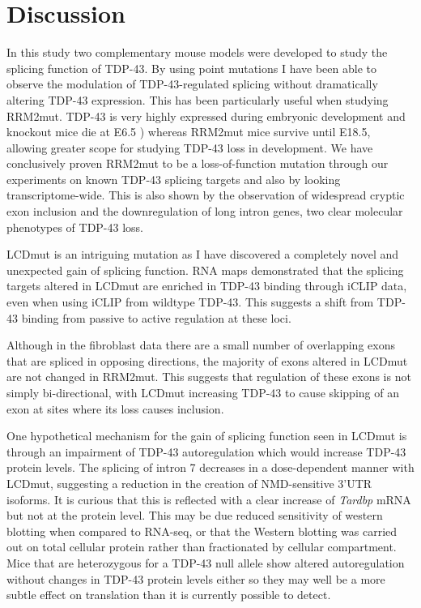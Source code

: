 \clearpage

\section{Discussion}

In this study  two complementary mouse models were developed to study the splicing function of TDP-43. 
By using point mutations I have been able to observe the modulation of TDP-43-regulated splicing without dramatically altering TDP-43 expression. 
This has been particularly useful when studying RRM2mut. 
TDP-43 is very highly expressed during embryonic development and knockout mice die at E6.5 \citep{Ricketts2014}) whereas RRM2mut mice survive until E18.5, allowing greater scope for studying TDP-43 loss in development.
We have conclusively proven RRM2mut to be a loss-of-function mutation through our experiments on known TDP-43 splicing targets and also by looking transcriptome-wide. 
This is also shown by the observation of widespread cryptic exon inclusion and the downregulation of long intron genes, two clear molecular phenotypes of TDP-43 loss.

LCDmut is an intriguing mutation as I have discovered a completely novel and unexpected gain of splicing function. 
RNA maps demonstrated that the splicing targets altered in LCDmut are enriched in TDP-43 binding through iCLIP data, even when using iCLIP from wildtype TDP-43. 
This suggests a shift from TDP-43 binding from passive to active regulation at these loci.

Although in the fibroblast data there are a small number of overlapping exons that are spliced in opposing directions, the majority of exons altered in LCDmut are not changed in RRM2mut. 
This suggests that regulation of these exons is not simply bi-directional, with LCDmut increasing TDP-43 to cause skipping of an exon at sites where its loss causes inclusion.

One hypothetical mechanism for the gain of splicing function seen in LCDmut is through an impairment of TDP-43 autoregulation which would increase TDP-43 protein levels.
The splicing of intron 7 decreases in a dose-dependent manner with LCDmut, suggesting a reduction in the creation of NMD-sensitive 3'UTR isoforms.
It is curious that this is reflected with a clear increase of \textit{Tardbp} mRNA but not at the protein level.
This may be due reduced sensitivity of western blotting when compared to RNA-seq, or that the Western blotting was carried out on total cellular protein rather than fractionated by cellular compartment.
Mice that are heterozygous for a TDP-43 null allele show altered autoregulation without changes in TDP-43 protein levels either \citep{Ricketts2014} so they may well be a more subtle effect on translation than it is currently possible to detect. 

